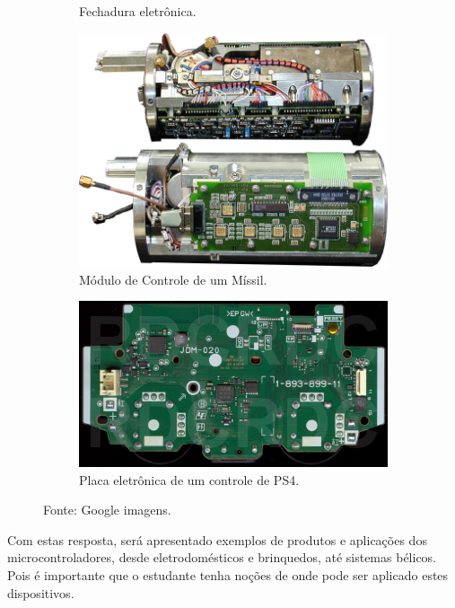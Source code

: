 \documentclass[12pt,a4paper]{report}
\begin{document}
\begin{figure}[H]
\begin{subfigure}{.4\textwidth}
      \caption{Fechadura eletrônica.}
      \label{fig:example_missle}
    \end{subfigure}
    \begin{subfigure}{.4\textwidth}
      \centering
      \includegraphics[width=1\linewidth]{fig/missile_module.png}
      \caption{Módulo de Controle de um Míssil.}
      \label{fig:plot_p8d25i0_025}
    \end{subfigure}
    \begin{subfigure}{.4\textwidth}
      \centering
      \includegraphics[width=1\linewidth]{fig/ps4_controller.png}
      \caption{Placa eletrônica de um controle de PS4.}
      \label{fig:plot_p8d35i0_05}
    \end{subfigure}
    \caption*{Fonte: Google imagens.}
    \label{figura:application_examples}
    \end{figure}

Com estas resposta, será apresentado exemplos de produtos e aplicações dos microcontroladores, desde eletrodomésticos e brinquedos, até sistemas bélicos. Pois é importante que o estudante tenha noções de onde pode ser aplicado estes dispositivos.
\end{document}
